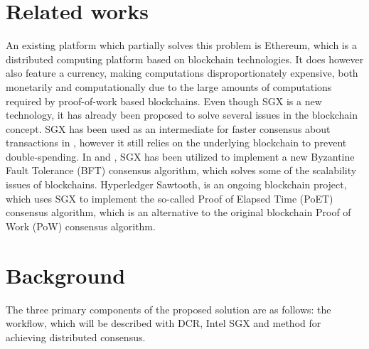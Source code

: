 \documentclass[12pt]{article}
\begin{document}
	\section{Related works}

	An existing platform which partially solves this problem is Ethereum\cite{ethereum-white-paper}, which is a distributed computing platform based on blockchain technologies.
	It does however also feature a currency, making computations disproportionately expensive, both monetarily and computationally due to the large amounts of computations required by proof-of-work based blockchains.
	Even though SGX is a new technology, it has already been proposed to solve several issues in the blockchain concept. 
	SGX has been used as an intermediate for faster consensus about transactions in \cite{improv-btc}, however it still relies on the underlying blockchain to prevent double-spending.
	In \cite{fastbft} and \cite{poet}, SGX has been utilized to implement a new Byzantine Fault Tolerance (BFT) consensus algorithm, which solves some of the scalability issues of blockchains.
	Hyperledger Sawtooth, is an ongoing blockchain project, which uses SGX to implement the so-called Proof of Elapsed Time (PoET) consensus algorithm, which is an alternative to the original blockchain Proof of Work (PoW) consensus algorithm.

	\section{Background}

	The three primary components of the proposed solution are as follows: the workflow, which will be described with DCR, Intel SGX and method for achieving distributed consensus.




\end{document}
